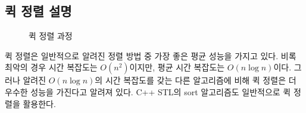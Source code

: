 \documentclass{article}
\begin{document}
\subsection{퀵 정렬 설명}
\begin{figure}
    \centering
    \caption{퀵 정렬 과정}
    \label{fig:quicksort}
\end{figure}
퀵 정렬은 일반적으로 알려진 정렬 방법 중 가장 좋은 평균 성능을 가지고 있다. 비록 최악의 경우 시간 복잡도는 $O(n^2)$이지만, 평균 시간 복잡도는 $O(n\log{n})$이다. 그러나 알려진 $O(n\log{n})$의 시간 복잡도를 갖는 다른 알고리즘에 비해 퀵 정렬은 더 우수한 성능을 가진다고 알려져 있다. C++ STL의 sort 알고리즘도 일반적으로 퀵 정렬을 활용한다.
\end{document}
